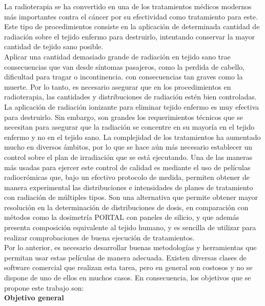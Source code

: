 La radioterapia se ha convertido en una de los tratamientos médicos modernos más importantes contra el cáncer por su efectividad como tratamiento para este. Este tipo de procedimientos consiste en la aplicación de determinada cantidad de radiación sobre el tejido enfermo para destruirlo, intentando conservar la mayor cantidad de tejido sano posible.\\

Aplicar una cantidad demasiado grande de radiación en tejido sano trae consecuencias que van desde síntomas pasajeros, como la perdida de cabello, dificultad para tragar o incontinencia. con consecuencias tan graves como la muerte\cite{cancer.net_2020}.  Por lo tanto, es necesario asegurar que en los procedimientos en radioterapia, las cantidades y distribuciones de radiación estén bien controladas.\\

La aplicación de radiación ionizante para eliminar tejido enfermo es muy efectiva para destruirlo. Sin embargo, son grandes los requerimientos técnicos que se necesitan para asegurar que la radiación se concentre en su mayoría en el tejido enfermo y no en el tejido sano. La complejidad de los tratamientos ha aumentado mucho en diversos ámbitos, por lo que se hace aún más necesario establecer un control sobre el plan de irradiación que se está ejecutando. Una de las maneras más usadas para ejercer este control de calidad es mediante el uso de películas radiocrómicas que, bajo un efectivo protocolo de medida, permiten obtener de manera experimental las distribuciones e intensidades de planes de tratamiento con radiación de múltiples tipos. Son una alternativa que permite obtener mayor resolución en la determinación de distribuciones de dosis, en comparación con métodos como la dosimetría PORTAL con paneles de silicio, y que además presenta composición equivalente al tejido humano, y es sencilla de utilizar para realizar comprobaciones de buena ejecución de tratamientos. \\

Por lo anterior, es necesario desarrollar buenas metodologías y herramientas que permitan usar estas películas de manera adecuada. Existen diversas clases de software comercial que realizan esta tarea, pero en general son costosos y no se dispone de uno de ellos en muchos casos. En consecuencia, los objetivos que se propone este trabajo son: \\

\textbf{Objetivo general}\\


